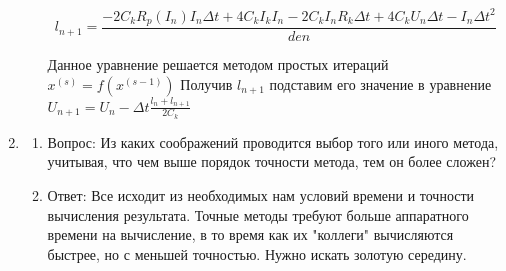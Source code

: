 \documentclass[12pt,a4paper]{scrartcl}
\begin{document}
\begin{enumerate}
\begin{enumerate}
			\begin{equation}
				l_{n+1} = \frac{-2C_kR_p(I_n)I_n\Delta t + 4C_kI_kI_n - 2C_kI_nR_k\Delta t + 4C_kU_n\Delta t - I_n\Delta t^2}{den}
			\end{equation}
			
			Данное уравнение решается методом простых итераций $x^{(s)} = f(x^(s-1))$
			Получив $l_{n+1}$ подставим его значение в уравнение $U_{n+1} = U_n - \Delta t \frac{l_n + l_{n + 1}}{2C_k}$
			
		\end{enumerate}
		\item \begin{enumerate}
			\item Вопрос: Из каких соображений проводится выбор того или иного метода,
			учитывая, что чем выше порядок точности метода, тем он более сложен?

			\item Ответ: Все исходит из необходимых нам условий времени и точности вычисления результата.
			Точные методы требуют больше аппаратного времени на вычисление, в то время как их "коллеги" вычисляются быстрее, но с меньшей точностью.
			Нужно искать золотую середину.
			 
		\end{enumerate}
	\end{enumerate} 	
	
	
	
	
\end{document}
